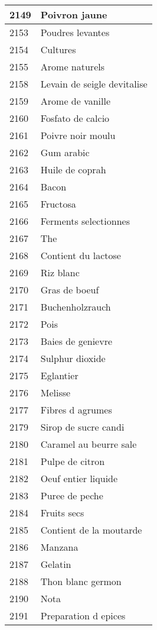 \begin{longtable}{|l|l|}
2149 & Poivron jaune \\ \hline 
2153 & Poudres levantes \\ \hline 
2154 & Cultures \\ \hline 
2155 & Arome naturels \\ \hline 
2158 & Levain de seigle devitalise \\ \hline 
2159 & Arome de vanille \\ \hline 
2160 & Fosfato de calcio \\ \hline 
2161 & Poivre noir moulu \\ \hline 
2162 & Gum arabic \\ \hline 
2163 & Huile de coprah \\ \hline 
2164 & Bacon \\ \hline 
2165 & Fructosa \\ \hline 
2166 & Ferments selectionnes \\ \hline 
2167 & The \\ \hline 
2168 & Contient du lactose \\ \hline 
2169 & Riz blanc \\ \hline 
2170 & Gras de boeuf \\ \hline 
2171 & Buchenholzrauch \\ \hline 
2172 & Pois \\ \hline 
2173 & Baies de genievre \\ \hline 
2174 & Sulphur dioxide \\ \hline 
2175 & Eglantier \\ \hline 
2176 & Melisse \\ \hline 
2177 & Fibres d agrumes \\ \hline 
2179 & Sirop de sucre candi \\ \hline 
2180 & Caramel au beurre sale \\ \hline 
2181 & Pulpe de citron \\ \hline 
2182 & Oeuf entier liquide \\ \hline 
2183 & Puree de peche \\ \hline 
2184 & Fruits secs \\ \hline 
2185 & Contient de la moutarde \\ \hline 
2186 & Manzana \\ \hline 
2187 & Gelatin \\ \hline 
2188 & Thon blanc germon \\ \hline 
2190 & Nota \\ \hline 
2191 & Preparation d epices \\ \hline 

\end{longtable}
